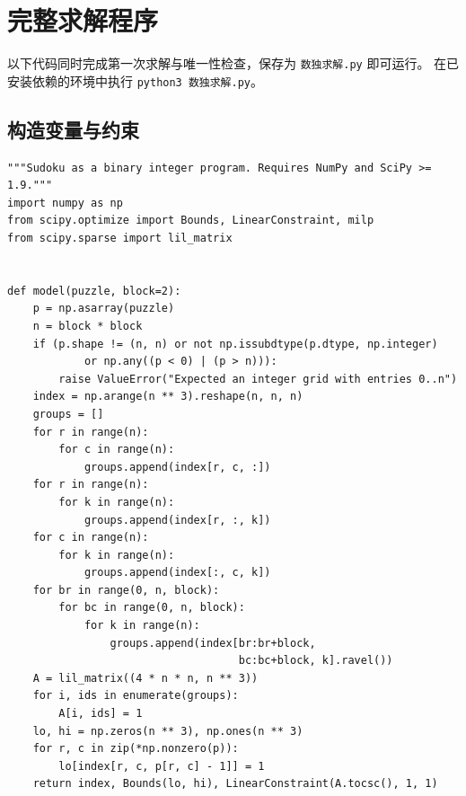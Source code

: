 \documentclass[UTF8,11pt,fontset=none]{ctexart}
\begin{document}
\clearpage
\appendix
\section{完整求解程序}
以下代码同时完成第一次求解与唯一性检查，保存为 \texttt{数独求解.py} 即可运行。
在已安装依赖的环境中执行 \texttt{python3 数独求解.py}。
\subsection{构造变量与约束}
\begin{lstlisting}
"""Sudoku as a binary integer program. Requires NumPy and SciPy >= 1.9."""
import numpy as np
from scipy.optimize import Bounds, LinearConstraint, milp
from scipy.sparse import lil_matrix


def model(puzzle, block=2):
    p = np.asarray(puzzle)
    n = block * block
    if (p.shape != (n, n) or not np.issubdtype(p.dtype, np.integer)
            or np.any((p < 0) | (p > n))):
        raise ValueError("Expected an integer grid with entries 0..n")
    index = np.arange(n ** 3).reshape(n, n, n)
    groups = []
    for r in range(n):
        for c in range(n):
            groups.append(index[r, c, :])
    for r in range(n):
        for k in range(n):
            groups.append(index[r, :, k])
    for c in range(n):
        for k in range(n):
            groups.append(index[:, c, k])
    for br in range(0, n, block):
        for bc in range(0, n, block):
            for k in range(n):
                groups.append(index[br:br+block,
                                    bc:bc+block, k].ravel())
    A = lil_matrix((4 * n * n, n ** 3))
    for i, ids in enumerate(groups):
        A[i, ids] = 1
    lo, hi = np.zeros(n ** 3), np.ones(n ** 3)
    for r, c in zip(*np.nonzero(p)):
        lo[index[r, c, p[r, c] - 1]] = 1
    return index, Bounds(lo, hi), LinearConstraint(A.tocsc(), 1, 1)
\end{lstlisting}
\clearpage
\end{document}
